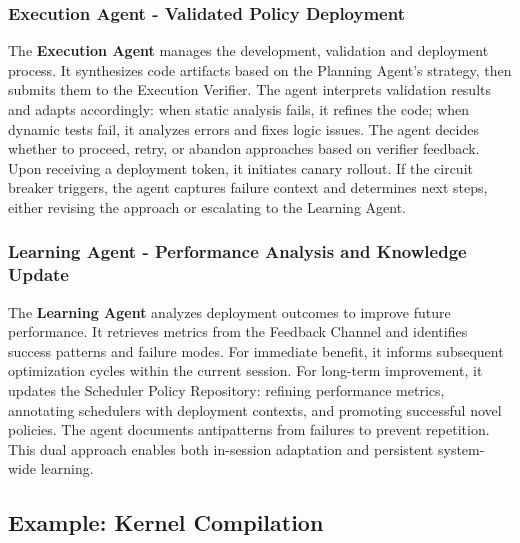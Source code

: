 \subsubsection{Execution Agent - Validated Policy Deployment}

The \textbf{Execution Agent} manages the development, validation and deployment process. It synthesizes code artifacts based on the Planning Agent's strategy, then submits them to the Execution Verifier. The agent interprets validation results and adapts accordingly: when static analysis fails, it refines the code; when dynamic tests fail, it analyzes errors and fixes logic issues. The agent decides whether to proceed, retry, or abandon approaches based on verifier feedback. Upon receiving a deployment token, it initiates canary rollout. If the circuit breaker triggers, the agent captures failure context and determines next steps, either revising the approach or escalating to the Learning Agent.

\subsubsection{Learning Agent - Performance Analysis and Knowledge Update}

The \textbf{Learning Agent} analyzes deployment outcomes to improve future performance. It retrieves metrics from the Feedback Channel and identifies success patterns and failure modes. For immediate benefit, it informs subsequent optimization cycles within the current session. For long-term improvement, it updates the Scheduler Policy Repository: refining performance metrics, annotating schedulers with deployment contexts, and promoting successful novel policies. The agent documents antipatterns from failures to prevent repetition. This dual approach enables both in-session adaptation and persistent system-wide learning.


\subsection{Example: Kernel Compilation}

